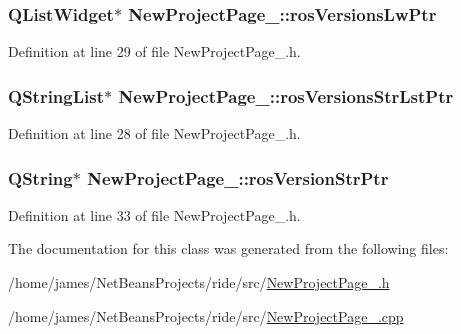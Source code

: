 \hypertarget{class_new_project_page__1_a45bba5023ff9ebd180cc0be64367b37a}{
\subsubsection[{ros\-Versions\-Lw\-Ptr}]{\setlength{\rightskip}{0pt plus 5cm}Q\-List\-Widget$\ast$ New\-Project\-Page\-\_\-::ros\-Versions\-Lw\-Ptr\hspace{0.3cm}{\ttfamily [private]}}}\label{class_new_project_page__1_a45bba5023ff9ebd180cc0be64367b37a}


Definition at line 29 of file New\-Project\-Page\-\_.\-h.

\hypertarget{class_new_project_page__1_a63e7e74af698edd3d4b72ed84864ad87}{
\subsubsection[{ros\-Versions\-Str\-Lst\-Ptr}]{\setlength{\rightskip}{0pt plus 5cm}Q\-String\-List$\ast$ New\-Project\-Page\-\_\-::ros\-Versions\-Str\-Lst\-Ptr\hspace{0.3cm}{\ttfamily [private]}}}\label{class_new_project_page__1_a63e7e74af698edd3d4b72ed84864ad87}


Definition at line 28 of file New\-Project\-Page\-\_.\-h.

\hypertarget{class_new_project_page__1_a0929e17b526e8267f97a6ec6f0f3b629}{
\subsubsection[{ros\-Version\-Str\-Ptr}]{\setlength{\rightskip}{0pt plus 5cm}Q\-String$\ast$ New\-Project\-Page\-\_\-::ros\-Version\-Str\-Ptr\hspace{0.3cm}{\ttfamily [private]}}}\label{class_new_project_page__1_a0929e17b526e8267f97a6ec6f0f3b629}


Definition at line 33 of file New\-Project\-Page\-\_.\-h.



The documentation for this class was generated from the following files\-:\begin{DoxyCompactItemize}
\item 
/home/james/\-Net\-Beans\-Projects/ride/src/\hyperlink{_new_project_page__1_8h}{New\-Project\-Page\-\_.\-h}\item 
/home/james/\-Net\-Beans\-Projects/ride/src/\hyperlink{_new_project_page__1_8cpp}{New\-Project\-Page\-\_.\-cpp}\end{DoxyCompactItemize}
